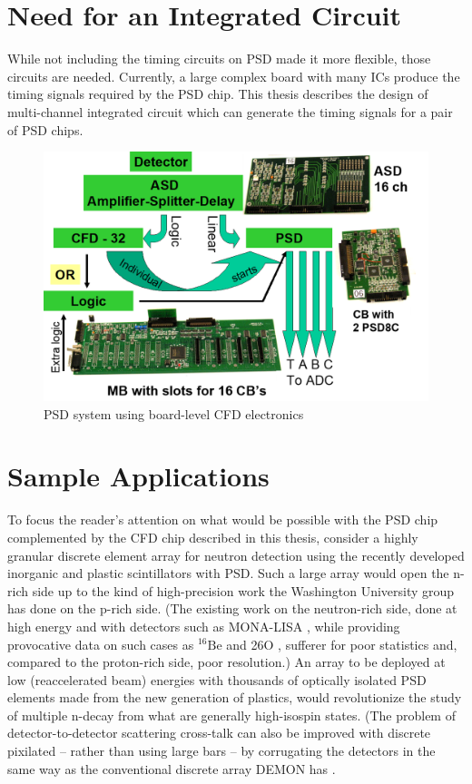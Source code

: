 \documentclass[12pt,oneside,final]{siuethesis}
\theoremstyle{definition}
\begin{document}
\section{Need for an Integrated Circuit}

While not including the timing circuits on PSD made it more flexible, those circuits are needed.  Currently, a large complex board with many ICs produce the timing signals required by the PSD chip. This thesis describes the design of multi-channel integrated circuit which can generate the timing signals for a pair of PSD chips.

\begin{figure}[htbp!]
	\centering
 	\includegraphics[scale=0.8,keepaspectratio=true]{./ch1_figures/PSD_system.png}
 	\caption{PSD system using board-level CFD electronics}
 	\label{FIG:PSD_SYSTEM}
\end{figure}



\section{Sample Applications}

To focus the reader's attention on what would be possible with the PSD chip complemented by the CFD chip described in this thesis, consider a highly granular discrete element array for neutron detection using the recently developed inorganic \cite{BUDDEN} and plastic \cite{ZAITSEVA} scintillators with PSD. Such a large array would open the n-rich side up to the kind of high-precision work the Washington University group has done on the p-rich side. (The existing work on the neutron-rich side, done at high energy and with detectors such as MONA-LISA \cite{BAUMANNA}, while providing provocative data on such cases as $^{16}\mathrm{Be}$ \cite{SPYROU} and 26O \cite{KOHLEY}, sufferer for poor statistics and, compared to the proton-rich side, poor resolution.) An array to be deployed at low (reaccelerated beam) energies with thousands of optically isolated PSD elements made from the new generation of plastics, would revolutionize the study of multiple n-decay from what are generally high-isospin states. (The problem of detector-to-detector scattering cross-talk can also be improved with discrete pixilated – rather than using large bars – by corrugating the detectors in the same way as the conventional discrete array DEMON has \cite{TILQUIN}.  
\end{document}
